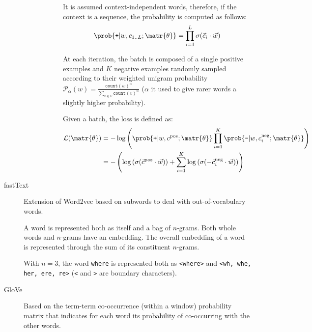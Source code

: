 \begin{description}
\begin{description}
\begin{description}
                        It is assumed context-independent words, therefore, if the context is a sequence, the probability is computed as follows:
                        \[ \prob{\texttt{+} | w, c_{1..L}; \matr{\theta}} = \prod_{i=1}^{L} \sigma(\vec{c}_i \cdot \vec{w}) \]

                        At each iteration, the batch is composed of a single positive examples and $K$ negative examples randomly sampled according to their weighted unigram probability $\mathcal{P}_\alpha(w) = \frac{\texttt{count}(w)^\alpha}{\sum_{v \in V} \texttt{count}(v)^\alpha}$ ($\alpha$ it used to give rarer words a slightly higher probability).

                        Given a batch, the loss is defined as:
                        \[
                            \begin{split}
                                \mathcal{L}(\matr{\theta}) &= -\log\left( \prob{\texttt{+} | w, c^\text{pos}; \matr{\theta}} \prod_{i=1}^{K} \prob{\texttt{-} | w, c^\text{neg}_{i}; \matr{\theta}} \right) \\
                                &= - \left( \log\left( \sigma(\vec{c}^\text{pos} \cdot \vec{w}) \right) + \sum_{i=1}^{K} \log\left( \sigma(-\vec{c}^\text{neg}_{i} \cdot \vec{w}) \right) \right)
                            \end{split}
                        \]
                \end{description}
        \end{description}


    \item[fastText] 
        Extension of Word2vec based on subwords to deal with out-of-vocabulary words.

        A word is represented both as itself and a bag of $n$-grams. Both whole words and $n$-grams have an embedding. The overall embedding of a word is represented through the sum of its constituent $n$-grams.

        \begin{example}
            With $n=3$, the word \texttt{where} is represented both as \texttt{<where>} and \texttt{<wh, whe, her, ere, re>} (\texttt{<} and \texttt{>} are boundary characters).
        \end{example}

    \item[GloVe] 
        Based on the term-term co-occurrence (within a window) probability matrix that indicates for each word its probability of co-occurring with the other words.


\end{description}
